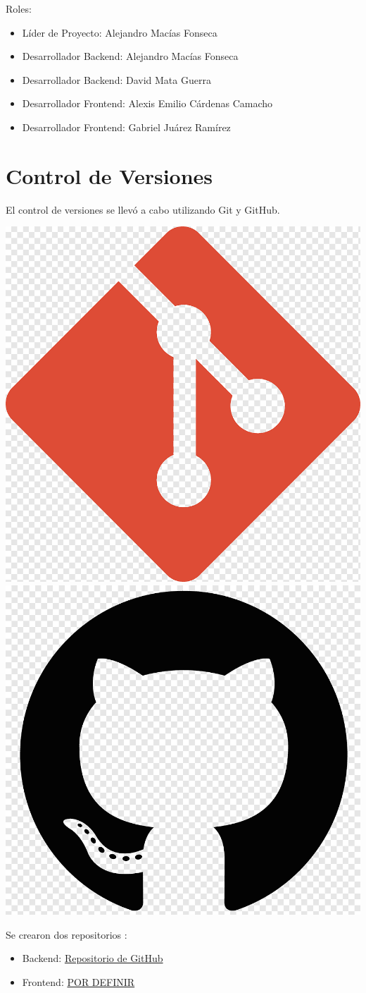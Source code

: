 	Roles: 
	\begin{itemize}
		\item Líder de Proyecto: Alejandro Macías Fonseca
		\item Desarrollador Backend: Alejandro Macías Fonseca
		\item Desarrollador Backend: David Mata Guerra
		\item Desarrollador Frontend: Alexis Emilio Cárdenas Camacho
		\item Desarrollador Frontend: Gabriel Juárez Ramírez
	\end{itemize}
	
	\section{Control de Versiones}
	El control de versiones se llevó a cabo utilizando Git y GitHub. 
		\begin{center}
		\includegraphics[width=0.3\linewidth]{./images/gitlogo.png}
		\includegraphics[width=0.3\linewidth]{./images/github_logo.png}
	\end{center}


	Se crearon dos repositorios :
	\begin{itemize}
	  \item Backend: \href{https://github.com/dmataguerra/proyecto_final_ing_requerimientos_back}{Repositorio de GitHub}
		\item   Frontend: \url{POR DEFINIR}	
	\end{itemize}


